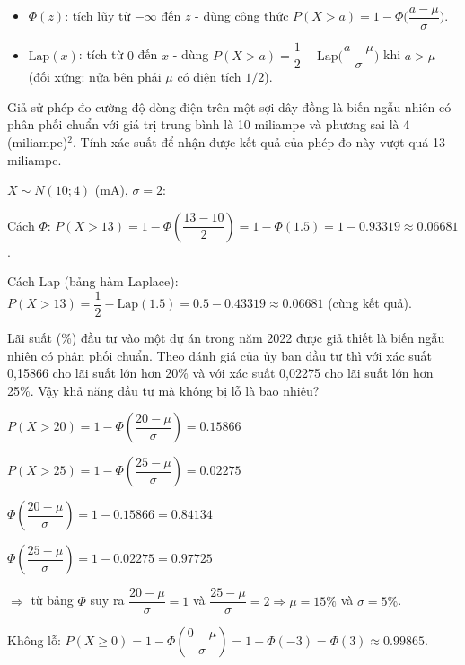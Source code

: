 \documentclass[12pt,a4paper]{article}
\begin{document}
\begin{luuy}[title={$\Phi$ hay $\mathrm{Lap}$?}]
  \begin{itemize}
    \item $\Phi(z)$: tích lũy từ $-\infty$ đến $z$ - dùng công thức $P(X > a) = 1 - \Phi\!\bigl(\dfrac{a-\mu}{\sigma}\bigr)$.
    \item $\mathrm{Lap}(x)$: tích từ $0$ đến $x$ - dùng $P(X > a) = \dfrac{1}{2} - \mathrm{Lap}\!\bigl(\dfrac{a-\mu}{\sigma}\bigr)$ khi $a > \mu$ (đối xứng: nửa bên phải $\mu$ có diện tích $1/2$).
  \end{itemize}
\end{luuy}

\begin{vidu}[title={Đo dòng điện}]
Giả sử phép đo cường độ dòng điện trên một sợi dây đồng là biến ngẫu nhiên có phân phối chuẩn với giá trị trung bình là 10 miliampe và phương sai là 4 (miliampe)$^2$. Tính xác suất để nhận được kết quả của phép đo này vượt quá 13 miliampe.

$X \sim N(10; 4)$ (mA), $\sigma = 2$:

Cách $\Phi$: $P(X > 13) = 1 - \Phi\!\left(\dfrac{13-10}{2}\right) = 1 - \Phi(1.5) = 1 - 0.93319 \approx 0.06681$.

Cách $\mathrm{Lap}$ (bảng hàm Laplace): $P(X > 13) = \dfrac{1}{2} - \mathrm{Lap}(1.5) = 0.5 - 0.43319 \approx 0.06681$ (cùng kết quả).
\end{vidu}

\begin{vidu}[title={Lãi suất đầu tư}]
Lãi suất (\%) đầu tư vào một dự án trong năm 2022 được giả thiết là biến ngẫu nhiên có phân phối chuẩn. Theo đánh giá của ủy ban đầu tư thì với xác suất 0,15866 cho lãi suất lớn hơn 20\% và với xác suất 0,02275 cho lãi suất lớn hơn 25\%. Vậy khả năng đầu tư mà không bị lỗ là bao nhiêu?

$P(X > 20) = 1 - \Phi\!\left(\dfrac{20-\mu}{\sigma}\right) = 0.15866$

$P(X > 25) = 1 - \Phi\!\left(\dfrac{25-\mu}{\sigma}\right) = 0.02275$

$\Phi\!\left(\dfrac{20-\mu}{\sigma}\right) = 1 - 0.15866 = 0.84134$

$\Phi\!\left(\dfrac{25-\mu}{\sigma}\right) = 1 - 0.02275 = 0.97725$

$\Rightarrow$ từ bảng $\Phi$ suy ra $\dfrac{20-\mu}{\sigma} = 1$ và $\dfrac{25-\mu}{\sigma} = 2 \Rightarrow \mu = 15\%$ và $\sigma = 5\%$.

Không lỗ: $P(X \ge 0) = 1 - \Phi\!\left(\dfrac{0-\mu}{\sigma}\right) = 1 - \Phi(-3) = \Phi(3) \approx 0.99865$.
\end{vidu}
\end{document}
